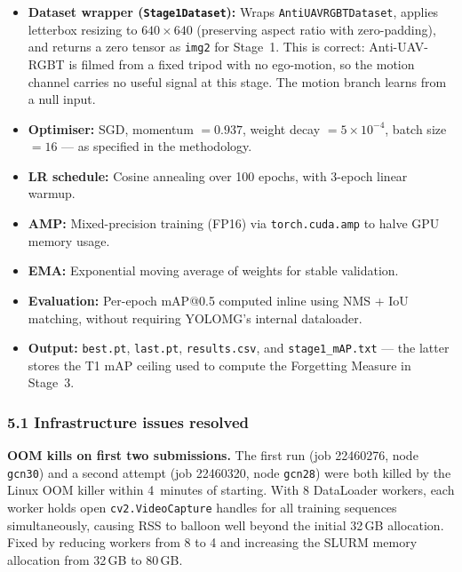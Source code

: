 \begin{itemize}
    \item \textbf{Dataset wrapper (\texttt{Stage1Dataset}):}
          Wraps \texttt{AntiUAVRGBTDataset}, applies letterbox
          resizing to $640\times640$ (preserving aspect ratio with
          zero-padding), and returns a zero tensor as \texttt{img2}
          for Stage~1. This is correct: Anti-UAV-RGBT is filmed from
          a fixed tripod with no ego-motion, so the motion channel
          carries no useful signal at this stage. The motion branch
          learns from a null input.
    \item \textbf{Optimiser:} SGD, momentum $= 0.937$, weight decay
          $= 5\times10^{-4}$, batch size $= 16$ — as specified in the
          methodology.
    \item \textbf{LR schedule:} Cosine annealing over 100 epochs,
          with 3-epoch linear warmup.
    \item \textbf{AMP:} Mixed-precision training (FP16) via
          \texttt{torch.cuda.amp} to halve GPU memory usage.
    \item \textbf{EMA:} Exponential moving average of weights for
          stable validation.
    \item \textbf{Evaluation:} Per-epoch mAP@0.5 computed inline
          using NMS + IoU matching, without requiring YOLOMG's
          internal dataloader.
    \item \textbf{Output:} \texttt{best.pt}, \texttt{last.pt},
          \texttt{results.csv}, and \texttt{stage1\_mAP.txt} —
          the latter stores the T1 mAP ceiling used to compute the
          Forgetting Measure in Stage~3.
\end{itemize}

\subsubsection*{5.1 Infrastructure issues resolved}

\textbf{OOM kills on first two submissions.} The first run (job
22460276, node \texttt{gcn30}) and a second attempt (job 22460320,
node \texttt{gcn28}) were both killed by the Linux OOM killer within
4~minutes of starting. With 8 DataLoader workers, each worker holds
open \texttt{cv2.VideoCapture} handles for all training sequences
simultaneously, causing RSS to balloon well beyond the initial
32\,GB allocation. Fixed by reducing workers from 8 to 4 and
increasing the SLURM memory allocation from 32\,GB to 80\,GB.

